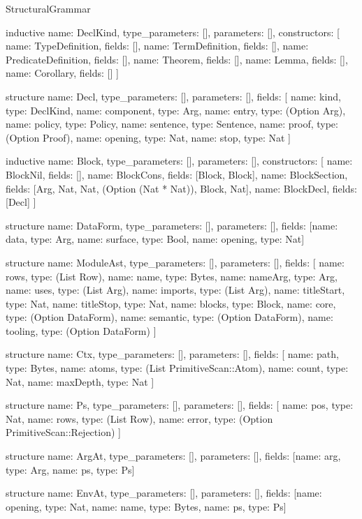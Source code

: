 \begin{lexlean}{StructuralGrammar}
\begin{semanticmodule}
inductive{
  name: DeclKind,
  type_parameters: [],
  parameters: [],
  constructors: [
    {name: TypeDefinition, fields: []},
    {name: TermDefinition, fields: []},
    {name: PredicateDefinition, fields: []},
    {name: Theorem, fields: []},
    {name: Lemma, fields: []},
    {name: Corollary, fields: []}
  ]
}

structure{
  name: Decl,
  type_parameters: [],
  parameters: [],
  fields: [
    {name: kind, type: DeclKind},
    {name: component, type: Arg},
    {name: entry, type: (Option Arg)},
    {name: policy, type: Policy},
    {name: sentence, type: Sentence},
    {name: proof, type: (Option Proof)},
    {name: opening, type: Nat},
    {name: stop, type: Nat}
  ]
}

inductive{
  name: Block,
  type_parameters: [],
  parameters: [],
  constructors: [
    {name: BlockNil, fields: []},
    {name: BlockCons, fields: [Block, Block]},
    {name: BlockSection, fields: [Arg, Nat, Nat, (Option (Nat * Nat)), Block, Nat]},
    {name: BlockDecl, fields: [Decl]}
  ]
}

structure{
  name: DataForm,
  type_parameters: [],
  parameters: [],
  fields: [{name: data, type: Arg}, {name: surface, type: Bool}, {name: opening, type: Nat}]
}

structure{
  name: ModuleAst,
  type_parameters: [],
  parameters: [],
  fields: [
    {name: rows, type: (List Row)},
    {name: name, type: Bytes},
    {name: nameArg, type: Arg},
    {name: uses, type: (List Arg)},
    {name: imports, type: (List Arg)},
    {name: titleStart, type: Nat},
    {name: titleStop, type: Nat},
    {name: blocks, type: Block},
    {name: core, type: (Option DataForm)},
    {name: semantic, type: (Option DataForm)},
    {name: tooling, type: (Option DataForm)}
  ]
}

structure{
  name: Ctx,
  type_parameters: [],
  parameters: [],
  fields: [
    {name: path, type: Bytes},
    {name: atoms, type: (List PrimitiveScan::Atom)},
    {name: count, type: Nat},
    {name: maxDepth, type: Nat}
  ]
}

structure{
  name: Ps,
  type_parameters: [],
  parameters: [],
  fields: [
    {name: pos, type: Nat},
    {name: rows, type: (List Row)},
    {name: error, type: (Option PrimitiveScan::Rejection)}
  ]
}

structure{
  name: ArgAt,
  type_parameters: [],
  parameters: [],
  fields: [{name: arg, type: Arg}, {name: ps, type: Ps}]
}

structure{
  name: EnvAt,
  type_parameters: [],
  parameters: [],
  fields: [{name: opening, type: Nat}, {name: name, type: Bytes}, {name: ps, type: Ps}]
}


\end{semanticmodule}
\end{lexlean}
